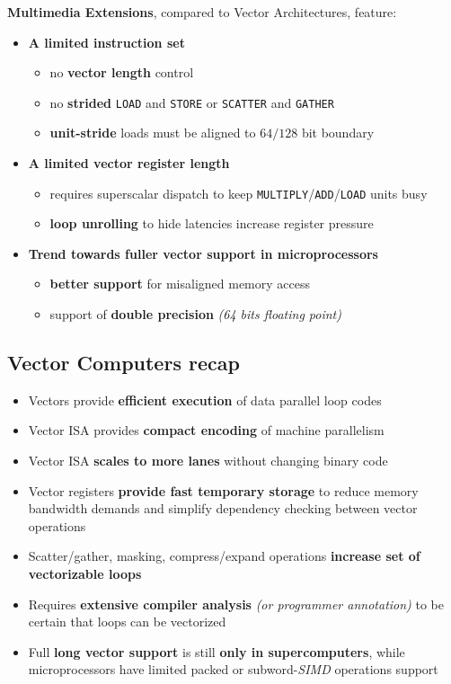 \documentclass[english]{article}
\begin{document}
\textbf{Multimedia Extensions}, compared to Vector Architectures, feature:

\begin{itemize}
  \item \textbf{A limited instruction set}
        \begin{itemize}[label=\xmarkthin]
          \item no \textbf{vector length} control
          \item no \textbf{strided} \texttt{LOAD} and \texttt{STORE} or \texttt{SCATTER} and \texttt{GATHER}
          \item \textbf{unit-stride} loads must be aligned to \(64/128\) bit boundary
        \end{itemize}
  \item \textbf{A limited vector register length}
        \begin{itemize}[label=\xmarkthin]
          \item requires superscalar dispatch to keep \texttt{MULTIPLY}/\texttt{ADD}/\texttt{LOAD} units busy
          \item \textbf{loop unrolling} to hide latencies increase register pressure
        \end{itemize}
  \item \textbf{Trend towards fuller vector support in microprocessors}
        \begin{itemize}[label=\cmarkthin]
          \item \textbf{better support} for misaligned memory access
          \item support of \textbf{double precision} \textit{(64 bits floating point)}
        \end{itemize}
\end{itemize}

\subsection{Vector Computers recap}

\begin{itemize}
  \item Vectors provide \textbf{efficient execution} of data parallel loop codes
  \item Vector ISA provides \textbf{compact encoding} of machine parallelism
  \item Vector ISA \textbf{scales to more lanes} without changing binary code
  \item Vector registers \textbf{provide fast temporary storage} to reduce memory bandwidth demands and simplify dependency checking between vector operations
  \item Scatter/gather, masking, compress/expand operations \textbf{increase set of vectorizable loops}
  \item Requires \textbf{extensive compiler analysis} \textit{(or programmer annotation)} to be certain that loops can be vectorized
  \item Full \textbf{long vector support} is still \textbf{only in supercomputers}, while microprocessors have limited packed or subword-\textit{SIMD} operations support
\end{itemize}
\end{document}
